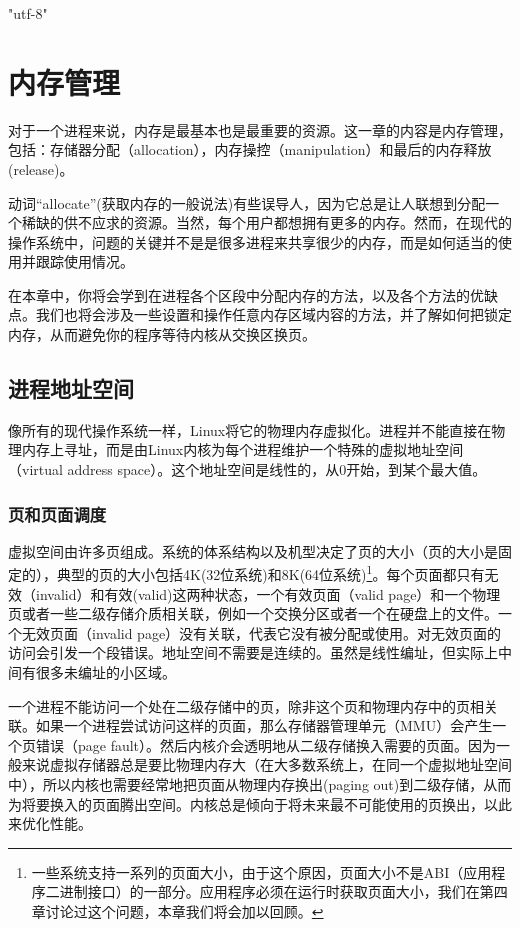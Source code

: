 \ifx\atempxetex\usewhat
\XeTeXinputencoding "utf-8"
\fi
{}

\chapter{内存管理}

对于一个进程来说，内存是最基本也是最重要的资源。这一章的内容是内存管理，包括：存储器分配（allocation），内存操控（manipulation）和最后的内存释放(release)。

动词“allocate”(获取内存的一般说法)有些误导人，因为它总是让人联想到分配一个稀缺的供不应求的资源。当然，每个用户都想拥有更多的内存。然而，在现代的操作系统中，问题的关键并不是是很多进程来共享很少的内存，而是如何适当的使用并跟踪使用情况。

在本章中，你将会学到在进程各个区段中分配内存的方法，以及各个方法的优缺点。我们也将会涉及一些设置和操作任意内存区域内容的方法，并了解如何把锁定内存，从而避免你的程序等待内核从交换区换页。 

\section{进程地址空间}

像所有的现代操作系统一样，Linux将它的物理内存虚拟化。进程并不能直接在物理内存上寻址，而是由Linux内核为每个进程维护一个特殊的虚拟地址空间（virtual address space）。这个地址空间是线性的，从0开始，到某个最大值。 

\subsection{页和页面调度}

虚拟空间由许多页组成。系统的体系结构以及机型决定了页的大小（页的大小是固定的），典型的页的大小包括4K(32位系统)和8K(64位系统)\footnote[1]{一些系统支持一系列的页面大小，由于这个原因，页面大小不是ABI（应用程序二进制接口）的一部分。应用程序必须在运行时获取页面大小，我们在第四章讨论过这个问题，本章我们将会加以回顾。}。每个页面都只有无效（invalid）和有效(valid)这两种状态，一个有效页面（valid page）和一个物理页或者一些二级存储介质相关联，例如一个交换分区或者一个在硬盘上的文件。一个无效页面（invalid page）没有关联，代表它没有被分配或使用。对无效页面的访问会引发一个段错误。地址空间不需要是连续的。虽然是线性编址，但实际上中间有很多未编址的小区域。

一个进程不能访问一个处在二级存储中的页，除非这个页和物理内存中的页相关联。如果一个进程尝试访问这样的页面，那么存储器管理单元（MMU）会产生一个页错误（page fault）。然后内核介会透明地从二级存储换入需要的页面。因为一般来说虚拟存储器总是要比物理内存大（在大多数系统上，在同一个虚拟地址空间中），所以内核也需要经常地把页面从物理内存换出(paging out)到二级存储，从而为将要换入的页面腾出空间。内核总是倾向于将未来最不可能使用的页换出，以此来优化性能。 

